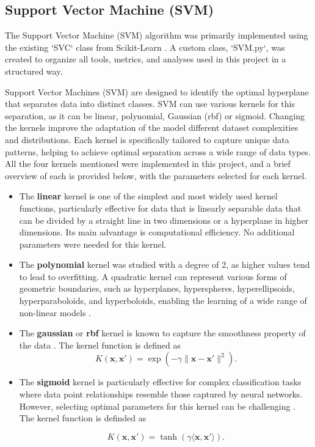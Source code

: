 \subsection{Support Vector Machine (SVM)}
The Support Vector Machine (SVM) algorithm was primarily implemented using the existing `SVC` class from Scikit-Learn \cite{sk-svm}. A custom class, `SVM.py`, was created to organize all tools, metrics, and analyses used in this project in a structured way. \newline

Support Vector Machines (SVM) are designed to identify the optimal hyperplane that separates data into distinct classes. SVM can use various kernels for this separation, as it can be linear, polynomial, Gaussian (rbf) or sigmoid. Changing the kernels improve the adaptation of the model different dataset complexities and distributions. Each kernel is specifically tailored to capture unique data patterns, helping to achieve optimal separation across a wide range of data types.
\newline
All the four kernels mentioned were implemented in this project, and a brief overview of each is provided below, with the parameters selected for each kernel.

\begin{itemize}
    \item The \textbf{linear} kernel is one of the simplest and most widely used kernel functions, particularly effective for data that is linearly separable data that can be divided by a straight line in two dimensions or a hyperplane in higher dimensions. Its main advantage is computational efficiency. No additional parameters were needed for this kernel.
\item The \textbf{polynomial} kernel was studied with a degree of 2, as higher values tend to lead to overfitting. A quadratic kernel can represent various forms of geometric boundaries, such as hyperplanes, hyperspheres, hyperellipsoids, hyperparaboloids, and hyperboloids, enabling the learning of a wide range of non-linear models \cite{quadratic}.
\item The \textbf{gaussian} or \textbf{rbf} kernel is known to capture the smoothness property of the data \cite{rbf}. The kernel function is defined as 
$$
K(\mathbf{x}, \mathbf{x'}) = \exp ( - \gamma \|\mathbf{x} - \mathbf{x'}\|^2 ).
$$

\item The \textbf{sigmoid} kernel is particularly effective for complex classification tasks where data point relationships resemble those captured by neural networks. However, selecting optimal parameters for this kernel can be challenging \cite{tanh}. The kernel function is definded as

$$
K(\mathbf{x}, \mathbf{x'}) = \tanh  ( \gamma \langle \mathbf{x} , \mathbf{x'} \rangle ).
$$



\end{itemize}

